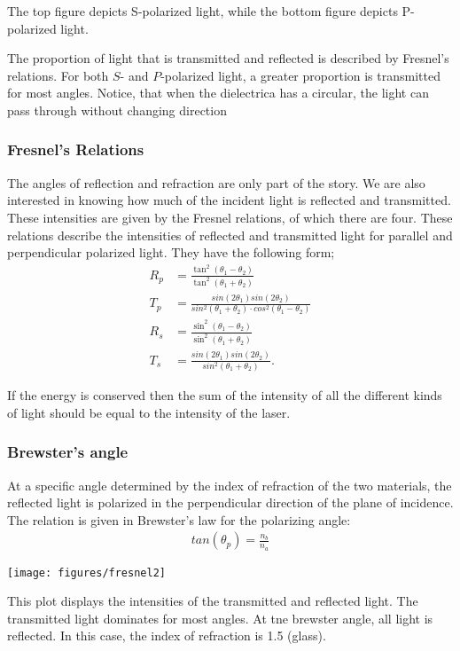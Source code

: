 \documentclass[working]{inputs/tuftebook}
\begin{document}
\begin{marginfigure}
    \caption{The top figure depicts S-polarized light, while the bottom figure depicts P-polarized light.}
    \label{fig:polarized}
\end{marginfigure}
\begin{marginfigure}
    \caption{The proportion of light that is transmitted and reflected is described by Fresnel's relations. For both $S$- and $P$-polarized light, a greater proportion is transmitted for most angles. Notice, that when the dielectrica has a circular, the light can pass through without changing direction} 
    \label{fig:fresnel1}
\end{marginfigure}
\subsubsection{Fresnel's Relations}
The angles of reflection and refraction are only part of the story. We are also interested in knowing how much of the incident light is reflected and transmitted. These intensities are given by the Fresnel relations, of which there are four. These relations describe the intensities of reflected and transmitted light for parallel and perpendicular polarized light. They have the following form;
\begin{align*}
	R_p &= \frac{\tan^2 \left( \theta_1 - \theta_2  \right) }{\tan^2 \left( \theta_1 + \theta_2  \right) }\\
	T_p &= \frac{sin(2\theta_1) sin(2\theta_2)}{sin^2(\theta_1+\theta_2)\cdot cos^2(\theta_1-\theta_2)}\\
	R_s &= \frac{\sin^2\left( \theta_1 - \theta_2 \right) }{\sin^2\left( \theta_1 + \theta_2 \right) } \\
	T_s &= \frac{sin(2\theta_1)sin(2\theta_2)}{sin^2(\theta_1 + \theta_2)}
.\end{align*}

If the energy is conserved then the sum of the intensity of all the different kinds of light should be equal to the intensity of the laser.
\subsubsection{Brewster's angle}
At a specific angle determined by the index of refraction of the two materials, the reflected light is polarized in the perpendicular direction of the plane of incidence. The relation is given in Brewster's law for the polarizing angle:
\begin{align*}
    tan(\theta_p) = \frac{n_b}{n_a}
\end{align*}
\begin{marginfigure}
	\texttt{[image: figures/fresnel2]}
	\caption{This plot displays the intensities of the transmitted and reflected light. The transmitted light dominates for most angles. At tne brewster angle, all light is reflected. In this case, the index of refraction is 1.5 (glass).}
\end{marginfigure}
\end{document}
